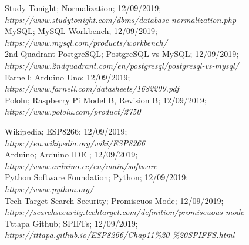 \documentclass{report}
\begin{document}
\begin{thebibliography}{9}
        Study Tonight; Normalization; 12/09/2019; \\
        \textit{https://www.studytonight.com/dbms/database-normalization.php} \\
        
        MySQL; MySQL Workbench; 12/09/2019; \\
        \textit{https://www.mysql.com/products/workbench/} \\
        
        2nd Quadrant PostgreSQL; PostgreSQL vs MySQL; 12/09/2019; \\
        \textit{https://www.2ndquadrant.com/en/postgresql/postgresql-vs-mysql/} \\
        
        Farnell; Arduino Uno; 12/09/2019; \\
        \textit{https://www.farnell.com/datasheets/1682209.pdf} \\
        
        Pololu; Raspberry Pi Model B, Revision B; 12/09/2019; \\
        \textit{https://www.pololu.com/product/2750}
        
        Wikipedia; ESP8266; 12/09/2019; \\
        \textit{https://en.wikipedia.org/wiki/ESP8266} \\
        
        Arduino; Arduino IDE ; 12/09/2019; \\
        \textit{https://www.arduino.cc/en/main/software} \\
        
        Python Software Foundation; Python; 12/09/2019; \\
        \textit{https://www.python.org/}\\
        
        Tech Target Search Security; Promiscuos Mode; 12/09/2019;\\ 
        \textit{https://searchsecurity.techtarget.com/definition/promiscuous-mode} \\
        
        Tttapa Github; SPIFFs; 12/09/2019; \\
        \textit{https://tttapa.github.io/ESP8266/Chap11\%20-\%20SPIFFS.html} \\
        

\end{thebibliography}
\end{document}
